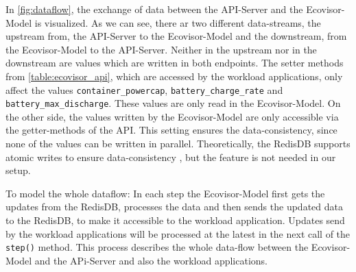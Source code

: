 In \ref{fig:dataflow}, the exchange of data between the API-Server and the Ecovisor-Model is visualized. As we can see, there ar two different data-streams, the upstream from, the API-Server to the Ecovisor-Model and the downstream, from the Ecovisor-Model to the API-Server.
Neither in the upstream nor in the downstream are values which are written in both endpoints. The setter methods from \ref{table:ecovisor_api}, which are accessed by the workload applications, only affect the values \texttt{container\_powercap}, \texttt{battery\_charge\_rate} and \texttt{battery\_max\_discharge}. These values are only read in the Ecovisor-Model. On the other side, the values written by the Ecovisor-Model are only accessible via the getter-methods of the API. This setting ensures the data-consistency, since none of the values can be written in parallel. Theoretically, the RedisDB supports atomic writes to ensure data-consistency \cite{redis}, but the feature is not needed in our setup.

To model the whole dataflow: In each step the Ecovisor-Model first gets the updates from the RedisDB, processes the data and then sends the updated data to the RedisDB, to make it accessible to the workload application. Updates send by the workload applications will be processed at the latest in the next call of the \texttt{step()} method. This process describes the whole data-flow between the Ecovisor-Model and the APi-Server and also the workload applications.



